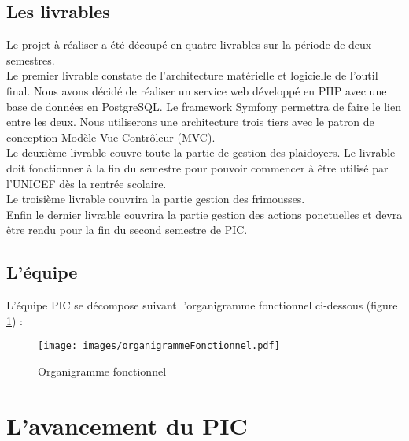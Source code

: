 \documentclass[asi]{picInsa}
\begin{document}
\section{Les livrables}
Le projet à réaliser a été découpé en quatre livrables sur la période de deux semestres.\vspace{0.5cm}\\
Le premier livrable constate de l'architecture matérielle et logicielle de l'outil final. Nous avons décidé de réaliser un service web développé en PHP avec une base de données en PostgreSQL. Le framework Symfony permettra de faire le lien entre les deux. Nous utiliserons une architecture trois tiers avec le patron de conception Modèle-Vue-Contrôleur (MVC).\vspace{0.5cm}\\
Le deuxième livrable couvre toute la partie de gestion des plaidoyers. Le livrable doit fonctionner à la fin du semestre pour pouvoir commencer à être utilisé par l'UNICEF dès la rentrée scolaire.\vspace{0.5cm}\\
Le troisième livrable couvrira la partie gestion des frimousses.\vspace{0.5cm}\\
Enfin le dernier livrable couvrira la partie gestion des actions ponctuelles et devra être rendu pour la fin du second semestre de PIC.



\section{L'équipe}
L'équipe PIC se décompose suivant l'organigramme fonctionnel ci-dessous (figure \ref{organigramme}) :
\begin{figure}[!h]
	\begin{center}
	\texttt{[image: images/organigrammeFonctionnel.pdf]}
	\label{organigramme}
	\caption{Organigramme fonctionnel}
	\end{center}
\end{figure} 





\chapter{L'avancement du PIC}
\label{avancement}
\end{document}
